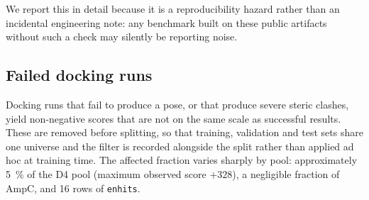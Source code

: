 We report this in detail because it is a reproducibility hazard rather than an
incidental engineering note: any benchmark built on these public artifacts
without such a check may silently be reporting noise.

\subsection{Failed docking runs}

Docking runs that fail to produce a pose, or that produce severe steric
clashes, yield non-negative scores that are not on the same scale as successful
results. These are removed before splitting, so that training, validation and
test sets share one universe and the filter is recorded alongside the split
rather than applied ad hoc at training time. The affected fraction varies
sharply by pool: approximately \SI{5}{\percent} of the D4 pool (maximum
observed score $+328$), a negligible fraction of AmpC, and \num{16} rows of
\texttt{enhits}.

